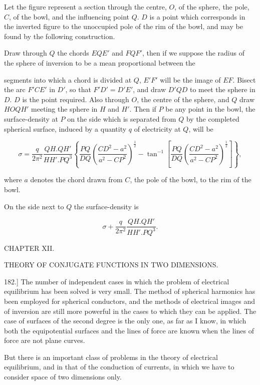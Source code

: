 \documentclass[11pt,a4paper]{article}
\begin{document}
Let the figure represent a section through the centre, $O$, of the sphere, the pole, $C$, of the bowl, and the influencing point $Q$. $D$ is a point which corresponds in the inverted figure to the unoccupied pole of the rim of the bowl, and may be found by the following construction.

Draw through $Q$ the chords $EQE'$ and $FQF'$, then if we suppose the radius of the sphere of inversion to be a mean proportional between the

segments into which a chord is divided at $Q$, $E'F'$ will be the image of $EF$. Bisect the arc $F'CE'$ in $D'$, so that $F'D'=D'E'$, and draw $D'QD$ to meet the sphere in $D$. $D$ is the point required. Also through $O$, the centre of the sphere, and $Q$ draw $HOQH'$ meeting the sphere in $H$ and $H'$. Then if $P$ be any point in the bowl, the surface-density at $P$ on the side which is separated from $Q$ by the completed spherical surface, induced by a quantity $q$ of electricity at $Q$, will be

\[
\sigma =
\frac{q}{2\pi^2}\frac{QH.QH'}{HH'.PQ^3}
\left\{
\frac{PQ}{DQ}\left(\frac{CD^2-a^2}{a^2-CP^2}\right)^{\frac12}
-\tan^{-1}\left[
\frac{PQ}{DQ}\left(\frac{CD^2-a^2}{a^2-CP^2}\right)^{\frac12}
\right]
\right\},
\]

where $a$ denotes the chord drawn from $C$, the pole of the bowl, to the rim of the bowl.

On the side next to $Q$ the surface-density is

\[
\sigma+\frac{q}{2\pi^2}\frac{QH.QH'}{HH'.PQ^3}.
\]

\begin{center}
\Large CHAPTER XII.
\end{center}

\begin{center}
THEORY OF CONJUGATE FUNCTIONS IN TWO DIMENSIONS.
\end{center}

182.] The number of independent cases in which the problem of electrical equilibrium has been solved is very small. The method of spherical harmonics has been employed for spherical conductors, and the methods of electrical images and of inversion are still more powerful in the cases to which they can be applied. The case of surfaces of the second degree is the only one, as far as I know, in which both the equipotential surfaces and the lines of force are known when the lines of force are not plane curves.

But there is an important class of problems in the theory of electrical equilibrium, and in that of the conduction of currents, in which we have to consider space of two dimensions only.
\end{document}
